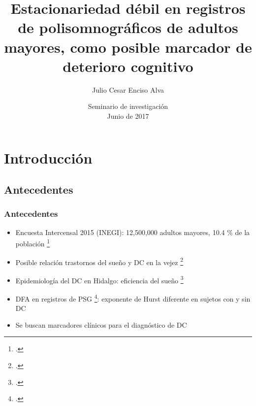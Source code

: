 \documentclass{beamer}
\title[Estacionariedad en PSG de adultos mayores]
{Estacionariedad d\'ebil en registros de polisomnogr\'aficos de adultos mayores, como posible 
marcador de deterioro cognitivo}
\author[Enciso Alva]
{Julio Cesar Enciso Alva}
\institute[LIMA]
{Licenciatura en Matem\'aticas Aplicadas}
\date[Junio 2017]
{Seminario de investigaci\'on\\ Junio de 2017}
\begin{document}
\frame{\titlepage}



\section{Introducci\'on}


\subsection{Antecedentes}

\begin{frame}\frametitle{Antecedentes}
\begin{itemize}
\item Encuesta Intercensal 2015 (INEGI): 12,500,000 adultos mayores, 10.4 \%  de la 
poblaci\'on \footcite{Intercensal15}

\item Posible relaci\'on trastornos del sue\~no y DC en la vejez \footcite{Miyata13}

\item Epidemiolog\'ia del DC en Hidalgo: eficiencia del sue\~no \footcite{VazquezTagle16}

\item DFA en registros de PSG \footcite{Valeria}: 
exponente de Hurst diferente en sujetos con y sin DC 

\item Se buscan marcadores cl\'inicos para el diagn\'ostico de DC
\end{itemize}
\end{frame}


\end{document}
